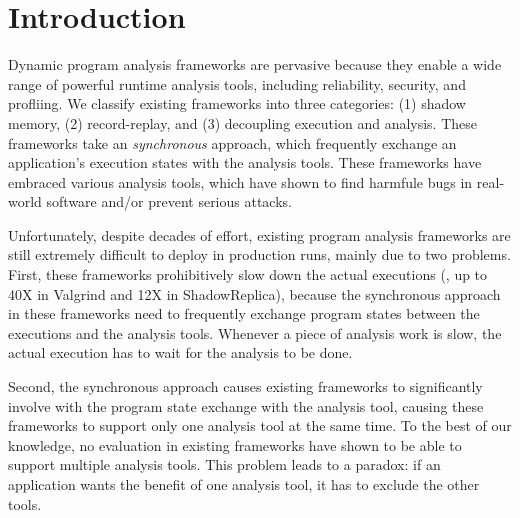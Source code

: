 \section{Introduction} \label{sec:intro}


Dynamic program analysis frameworks are pervasive because they enable a wide 
range of powerful runtime analysis tools, including reliability, security, and 
profliing. We classify existing frameworks into three categories: (1) shadow 
memory, (2) record-replay, and (3) decoupling execution and analysis. These 
frameworks take an \emph{synchronous} approach, which frequently exchange an 
application's execution states with the analysis tools. These frameworks have 
embraced various analysis tools, which have shown to find harmfule bugs in 
real-world software and/or prevent serious attacks.





Unfortunately, despite decades of effort, existing program analysis frameworks 
are still extremely difficult to deploy in production runs, mainly due to two 
problems. First, these frameworks prohibitively slow down the actual executions 
(\eg, up to 40X in Valgrind and 12X in ShadowReplica), because the synchronous 
approach in these frameworks need to frequently exchange program states between 
the executions and the analysis tools. Whenever a piece of analysis work is 
slow, the actual execution has to wait for the analysis to be done.

Second, the synchronous approach causes existing frameworks to significantly 
involve with the program state exchange with the analysis tool, causing these 
frameworks to support only one analysis tool at the same time. To the best of 
our knowledge, no evaluation in existing frameworks have shown to be able to 
support multiple analysis tools. This problem leads to a paradox: if an 
application wants the benefit of one analysis tool, it has to exclude the other 
tools.

